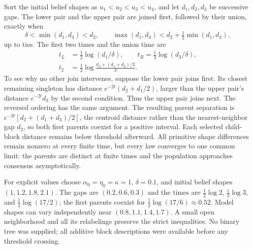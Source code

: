 Sort the initial belief shapes as $u_1<u_2<u_3<u_4$, and let $d_1,d_2,d_3$ be successive gaps. The lower pair and the upper pair are joined first, followed by their union, exactly when
\begin{equation}
 \delta<\min(d_1,d_3)<d_2,
 \qquad \max(d_1,d_3)<d_2+\tfrac12\min(d_1,d_3),
 \label{cf:gaps}
\end{equation}
up to ties. The first two times and the union time are
\begin{equation}
 \begin{aligned}
 t_L&=\tfrac12\log(d_1/\delta),
 \qquad t_R=\tfrac12\log(d_3/\delta),\\
 t_2&=\tfrac12\log\frac{d_2+(d_1+d_3)/2}{\delta}.
 \end{aligned}
 \label{cf:times}
\end{equation}
To see why no other join intervenes, suppose the lower pair joins first. Its closest remaining singleton has distance $e^{-2t}(d_2+d_1/2)$, larger than the upper pair's distance $e^{-2t}d_3$ by the second condition. Thus the upper pair joins next. The reversed ordering has the same argument. The resulting parent separation is $e^{-2t}[d_2+(d_1+d_3)/2]$, the centroid distance rather than the nearest-neighbor gap $d_2$, so both first parents coexist for a positive interval. Each selected child-block distance remains below threshold afterward. All primitive shape differences remain nonzero at every finite time, but every law converges to one common limit: the parents are distinct at finite times and the population approaches consensus asymptotically.

For explicit values choose $\alpha_0=\eta_0=\kappa=1$, $\delta=0.1$, and initial belief shapes $(1,1.2,1.8,2.1)$. The gaps are $(0.2,0.6,0.3)$ and the times are $\tfrac12\log2$, $\tfrac12\log3$, and $\tfrac12\log(17/2)$; the first parents coexist for $\tfrac12\log(17/6)\approx0.52$. Model shapes can vary independently near $(0.8,1.1,1.4,1.7)$. A small open neighborhood and all its relabelings preserve the strict inequalities. No binary tree was supplied; all additive block descriptions were available before any threshold crossing.

